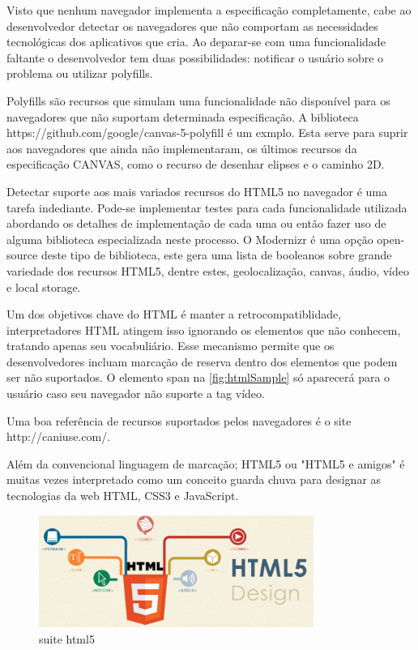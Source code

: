 \documentclass[
12pt,
a4paper,
portuges,
draft
]{report}
\begin{document}
Visto que nenhum navegador implementa a especificação completamente,
cabe ao desenvolvedor detectar os navegadores que não comportam as
necessidades tecnológicas dos aplicativos que cria. Ao deparar-se com uma funcionalidade
faltante o desenvolvedor tem duas possibilidades: notificar o usuário sobre o
problema ou utilizar polyfills.

Polyfills são recursos que simulam uma funcionalidade não disponível para
os navegadores que não suportam determinada especificação. A biblioteca
https://github.com/google/canvas-5-polyfill é um exmplo. Esta serve para
suprir aos navegadores que ainda não implementaram, os últimos recursos
da especificação CANVAS, como o recurso de desenhar elipses e o caminho 2D.

Detectar suporte aos mais variados recursos do HTML5 no navegador
é uma tarefa indediante. Pode-se implementar testes para
cada funcionalidade utilizada abordando os detalhes de implementação
de cada uma ou então fazer uso de alguma biblioteca especializada
neste processo. O Modernizr é uma opção open-source deste tipo de
biblioteca, este gera uma lista de booleanos sobre grande variedade dos
recursos HTML5, dentre estes, geolocalização, canvas, áudio, vídeo e
local storage.

Um dos objetivos chave do HTML é manter a retrocompatiblidade,
interpretadores HTML atingem isso ignorando os elementos que não conhecem, tratando apenas
seu vocabuliário. Esse mecanismo permite que os desenvolvedores incluam
marcação de reserva dentro dos elementos que podem ser não suportados.
O elemento span na \ref{fig:htmlSample} só aparecerá para o usuário caso seu
navegador não suporte a tag vídeo.

Uma boa referência de recursos suportados pelos navegadores é o site
http://caniuse.com/.

Além da convencional linguagem de marcação; HTML5 ou "HTML5 e amigos"
é muitas vezes interpretado como um conceito guarda chuva para designar
as tecnologias da web HTML, CSS3 e JavaScript.

\begin{figure}
    \centering
    \includegraphics[width=0.8\textwidth,natwidth=610,natheight=642]{html5.jpg}
	\caption{suite html5}
\end{figure}
\end{document}
